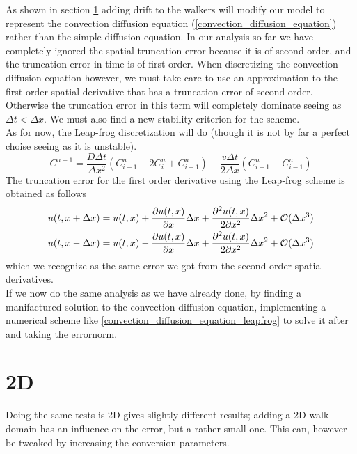 As shown in section \ref{} adding drift to the walkers will modify our model to represent the convection diffusion equation (\ref{convection_diffusion_equation}) rather than the simple diffusion equation. 
In our analysis so far we have completely ignored the spatial truncation error because it is of second order, and the truncation error in time is of first order. 
When discretizing the convection diffusion equation however, we must take care to use an approximation to the first order spatial derivative that has a truncation error of second order. 
Otherwise the truncation error in this term will completely dominate seeing as $\Delta t<\Delta x$. 
We must also find a new stability criterion for the scheme. \\
As for now, the Leap-frog discretization will do (though it is not by far a perfect choise seeing as it is unstable).
\begin{equation}\label{convection_diffusion_equation_leapfrog}
 C^{n+1} = \frac{D\Delta t}{\Delta x^2}\left(C^n_{i+1}-2C^n_i+C^n_{i-1}\right)-\frac{v\Delta t}{2\Delta x}\left(C^n_{i+1}-C^n_{i-1}\right)
\end{equation}
The truncation error for the first order derivative using the Leap-frog scheme is obtained as follows
\begin{align*}
 u(t,x+\Delta x) = u(t,x) + \frac{\partial u(t,x)}{\partial x}\Delta x + \frac{\partial^2u(t,x)}{2\partial x^2}\Delta x^2 +\mathcal{O}(\Delta x^3)\\
 u(t,x-\Delta x) = u(t,x) - \frac{\partial u(t,x)}{\partial x}\Delta x + \frac{\partial^2u(t,x)}{2\partial x^2}\Delta x^2 +\mathcal{O}(\Delta x^3)
\end{align*}
which we recognize as the same error we got from the second order spatial derivatives.\\
If we now do the same analysis as we have already done, by finding a manifactured solution to the convection diffusion equation, implementing a numerical scheme like \ref{convection_diffusion_equation_leapfrog} to solve it after and taking the errornorm.


\section{2D}
Doing the same tests is 2D gives slightly different results; adding a 2D walk-domain has an influence on the error, but a rather small one. 
This can, however be tweaked by increasing the conversion parameters.